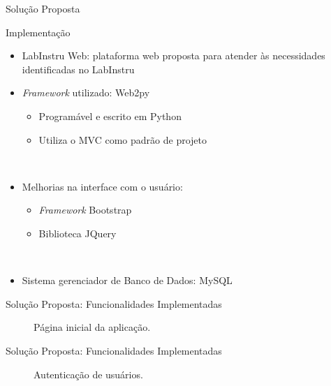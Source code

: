 \begin{frame}{Solução Proposta}
	\begin{block}{Implementação}
		\begin{itemize}
			\item \alert{LabInstru Web}: plataforma web proposta para atender às necessidades identificadas no LabInstru
			\ \ \newline
			\item \emph{Framework} utilizado: Web2py
				\begin{itemize}
					\item Programável e escrito em Python
					\item Utiliza o MVC como padrão de projeto
				\end{itemize}
			\ \ \newline
			\item Melhorias na interface com o usuário:
			\begin{itemize}
				\item \emph{Framework} Bootstrap
				\item Biblioteca JQuery
			\end{itemize}
			\ \ \newline
			\item Sistema gerenciador de Banco de Dados: MySQL
		\end{itemize}
	\end{block}
\end{frame}

\begin{frame}{Solução Proposta: Funcionalidades Implementadas}
\begin{figure}[h!]
\centering
{}
\caption{Página inicial da aplicação.}
\end{figure}
\end{frame}

\begin{frame}{Solução Proposta: Funcionalidades Implementadas}
\begin{figure}[h!]
\centering
{}
\caption{Autenticação de usuários.}
\end{figure}
\end{frame}

